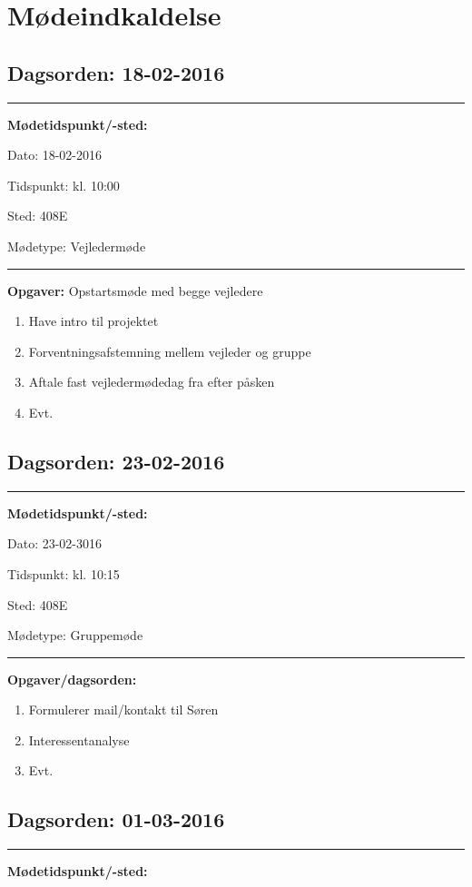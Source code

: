 \chapter{Mødeindkaldelse}

\section{Dagsorden: 18-02-2016 }
\hrule
\textbf{Mødetidspunkt/-sted:} 

Dato: \tabto{7em} 18-02-2016

Tidspunkt: \tabto{7em} kl. 10:00

Sted: \tabto{7em} 408E

Mødetype: \tabto{7em} Vejledermøde \newline


\hrule
\textbf{Opgaver:} \newline
Opstartsmøde med begge vejledere
\begin{enumerate}
\item Have intro til projektet
\item Forventningsafstemning mellem vejleder og gruppe 
\item Aftale fast vejledermødedag fra efter påsken
\item Evt. 
\end{enumerate}


\section{Dagsorden: 23-02-2016 }
\hrule
\textbf{Mødetidspunkt/-sted:} 

Dato: \tabto{7em} 23-02-3016

Tidspunkt: \tabto{7em} kl. 10:15

Sted: \tabto{7em} 408E

Mødetype: \tabto{7em} Gruppemøde \newline


\hrule
\textbf{Opgaver/dagsorden:} \newline
\begin{enumerate}
	\item Formulerer mail/kontakt til Søren
	\item Interessentanalyse 
	\item Evt. 
\end{enumerate}


\section{Dagsorden: 01-03-2016 }
\hrule
\textbf{Mødetidspunkt/-sted:} 

